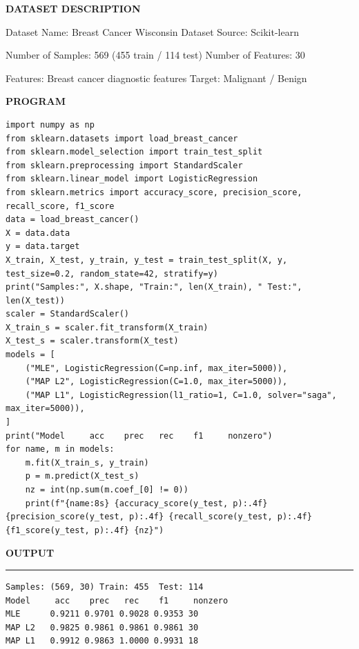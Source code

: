 \documentclass[11pt,twoside]{article}
\newcommand{\expheading}[1]{{\fontsize{14}{17}\selectfont\textbf{#1}\par}}
\newcommand{\toevenpage}{\clearpage\ifodd\value{page}\null\thispagestyle{empty}\newpage\fi}
\begin{document}
{\expheading{DATASET DESCRIPTION}
\vspace{4pt}
\noindent Dataset Name: Breast Cancer Wisconsin Dataset \hspace{0.3cm} Source: Scikit-learn\par
\noindent Number of Samples: 569 (455 train / 114 test) \hspace{0.3cm} Number of Features: 30\par
\noindent Features: Breast cancer diagnostic features \hspace{0.3cm} Target: Malignant / Benign \par
\vspace{4pt}
} %
\toevenpage
\expheading{PROGRAM}
\vspace{6pt}

\begin{lstlisting}
import numpy as np
from sklearn.datasets import load_breast_cancer
from sklearn.model_selection import train_test_split
from sklearn.preprocessing import StandardScaler
from sklearn.linear_model import LogisticRegression
from sklearn.metrics import accuracy_score, precision_score, recall_score, f1_score
data = load_breast_cancer()
X = data.data
y = data.target
X_train, X_test, y_train, y_test = train_test_split(X, y, test_size=0.2, random_state=42, stratify=y)
print("Samples:", X.shape, "Train:", len(X_train), " Test:", len(X_test))
scaler = StandardScaler()
X_train_s = scaler.fit_transform(X_train)
X_test_s = scaler.transform(X_test)
models = [
    ("MLE", LogisticRegression(C=np.inf, max_iter=5000)),
    ("MAP L2", LogisticRegression(C=1.0, max_iter=5000)),
    ("MAP L1", LogisticRegression(l1_ratio=1, C=1.0, solver="saga", max_iter=5000)),
]
print("Model     acc    prec   rec    f1     nonzero")
for name, m in models:
    m.fit(X_train_s, y_train)
    p = m.predict(X_test_s)
    nz = int(np.sum(m.coef_[0] != 0))
    print(f"{name:8s} {accuracy_score(y_test, p):.4f} {precision_score(y_test, p):.4f} {recall_score(y_test, p):.4f} {f1_score(y_test, p):.4f} {nz}")
\end{lstlisting}
\toevenpage
\expheading{OUTPUT}
\vspace{2pt}
\noindent\rule{\textwidth}{0.5pt}\par
\vspace{4pt}
\begin{verbatim}
Samples: (569, 30) Train: 455  Test: 114
Model     acc    prec   rec    f1     nonzero
MLE      0.9211 0.9701 0.9028 0.9353 30
MAP L2   0.9825 0.9861 0.9861 0.9861 30
MAP L1   0.9912 0.9863 1.0000 0.9931 18
\end{verbatim}
\vspace{4pt}
\end{document}
